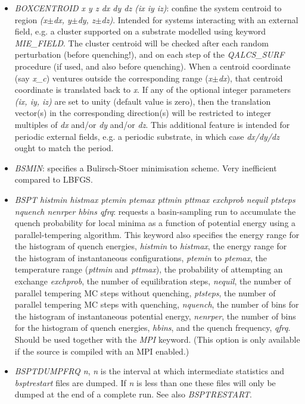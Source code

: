 \documentclass[12pt,a4paper,dvips]{article}
\begin{document}
\begin{itemize}
\item {\it BOXCENTROID x y z dx dy dz (ix iy iz)}: confine the system centroid to region {\it (x$\pm$dx, y$\pm$dy, z$\pm$dz)}. Intended for systems interacting with an external field, e.g. a cluster supported on a substrate modelled using keyword {\it MIE\_FIELD}. The cluster centroid will be checked after each random perturbation (before quenching!), and on each step of the {\it QALCS\_SURF} procedure (if used, and also before quenching). When a centroid coordinate (say {\it x\_c}) ventures outside the corresponding range ({\it x$\pm$dx}), that centroid coordinate is translated back to {\it x}. If any of the optional integer parameters {\it (ix, iy, iz)} are set to unity (default value is zero), then the translation vector(s) in the corresponding direction(s) will be restricted to integer multiples of {\it dx} and/or {\it dy} and/or {\it dz}. This additional feature is intended for periodic external fields, e.g. a periodic substrate, in which case {\it dx/dy/dz} ought to match the period.

\item {\it BSMIN\/}: specifies a Bulirsch-Stoer minimisation scheme. 
Very inefficient compared to LBFGS.

\item {\it BSPT histmin histmax ptemin ptemax pttmin pttmax exchprob nequil ptsteps nquench nenrper hbins qfrq\/}: 
requests a basin-sampling run to accumulate the quench probability for local minima 
as a function of potential energy using 
a parallel-tempering algorithm. 
This keyword also specifies the energy range for the histogram of quench energies,
{\it histmin\/} to {\it histmax\/},
the energy range for the histogram of instantaneous configurations, {\it ptemin} to {\it ptemax}, 
the temperature range ({\it pttmin} and {\it pttmax}), 
the probability of attempting an exchange {\it exchprob}, the 
number of equilibration steps, {\it nequil},
the number of parallel tempering MC steps without quenching,  {\it ptsteps},
the number of parallel tempering MC steps with quenching,  {\it nquench},
the number of bins for the histogram of instantaneous potential energy, {\it nenrper},
the number of bins for the histogram of quench energies, {\it hbins},  
and the quench frequency, {\it qfrq}.  
Should be used together with the {\it MPI\/} keyword. %
(This option is only available if the source is compiled with an MPI enabled.)  

\item {\it BSPTDUMPFRQ n\/}, {\it n\/} is the interval at which intermediate statistics
and {\it bsptrestart\/} files are dumped. If {\it n\/} is less than one these files
will only be dumped at the end of a complete run. 
See also {\it BSPTRESTART\/}.


\end{itemize}
\end{document}

